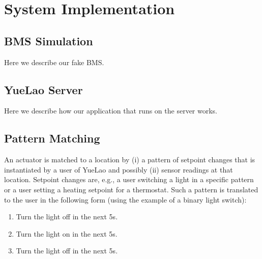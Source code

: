 
%
%
%

\section{System Implementation} %
\label{sec:system_implementation}


\subsection{BMS Simulation} %
\label{sub:bms_simulation}
Here we describe our fake BMS.



\subsection{YueLao Server} %
\label{sub:babel_server}
Here we describe how our application that runs on the server works.


\subsection{Pattern Matching} %
\label{sub:pattern_matching}

An actuator is matched to a location by (i) a pattern of setpoint changes that is instantiated by a user of YueLao and possibly (ii) sensor readings at that location.
Setpoint changes are, e.g., a user switching a light in a specific pattern or a user setting a heating setpoint for a thermostat.
Such a pattern is translated to the user in the following form (using the example of a binary light switch):

\begin{enumerate}

  \item Turn the light off in the next 5s.

  \item Turn the light on in the next 5s.

  \item Turn the light off in the next 5s.

\end{enumerate}


